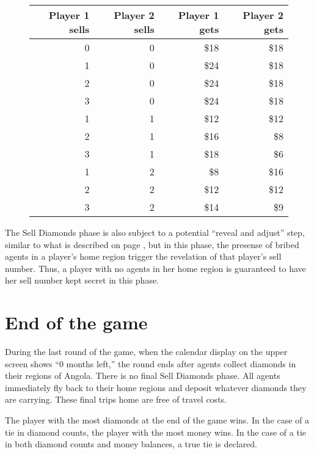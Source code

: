\documentclass[8pt]{extbook}
\begin{document}
\begin{figure}[t]
\begin{center}
\begin{tabular}{r|r||r|r}
Player 1 sells & Player 2 sells & Player 1 gets & Player 2 gets\\
\hline
\hline
0 & 0 & \$18 & \$18 \\
\hline
1 & 0 & \$24 & \$18 \\
2 & 0 & \$24 & \$18 \\
3 & 0 & \$24 & \$18 \\
\hline
1 & 1 & \$12 & \$12 \\
2 & 1 & \$16 & \$8 \\
3 & 1 & \$18 & \$6 \\
\hline
1 & 2 & \$8 & \$16 \\
2 & 2 & \$12 & \$12 \\
3 & 2 & \$14 & \$9 \\
\end{tabular} 
\end{center}
\label{fig:sellTable}

\end{figure}

The Sell Diamonds phase is also subject to a potential ``reveal and adjust'' step, similar to what is described on page \pageref{sec:movesRevealed}, but in this phase, the presense of bribed agents in a player's home region trigger the revelation of that player's sell number.  Thus, a player with no agents in her home region is guaranteed to have her sell number kept secret in this phase.


\section{End of the game}

During the last round of the game, when the calendar display on the upper screen shows ``0 months left,'' the round ends after agents collect diamonds in their regions of Angola.  There is no final Sell Diamonds phase.  All agents immediately fly back to their home regions and deposit whatever diamonds they are carrying.  These final trips home are free of travel costs.

The player with the most diamonds at the end of the game wins.  In the case of a tie in diamond counts, the player with the most money wins.  In the case of a tie in both diamond counts and money balances, a true tie is declared.
\end{document}
